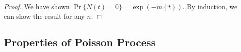\documentclass[a4paper,10pt]{article}
\theoremstyle{plain}
\theoremstyle{definition}
\begin{document}
\begin{proof}
We have shown $\Pr\{N(t)=0\} = \exp(-\bar{m}(t))$. By induction, we can show the result for any $n$.
\end{proof}

\subsection{Properties of Poisson Process}
\end{document}
